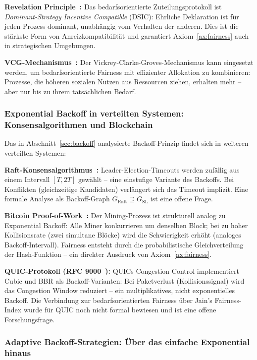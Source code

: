 ﻿\documentclass[a4paper,12pt]{article}
\theoremstyle{definition}
\begin{document}
\textbf{Revelation Principle~\cite{myerson1981optimal}:}
Das bedarfsorientierte Zuteilungsprotokoll ist
\emph{Dominant-Strategy Incentive Compatible} (DSIC):
Ehrliche Deklaration ist für jeden Prozess dominant,
unabhängig vom Verhalten der anderen. Dies ist die stärkste
Form von Anreizkompatibilität und garantiert Axiom~\ref{ax:fairness}
auch in strategischen Umgebungen.

\textbf{VCG-Mechanismus~\cite{vickrey1961counterspeculation}:}
Der Vickrey-Clarke-Groves-Mechanismus kann eingesetzt werden,
um bedarfsorientierte Fairness mit effizienter Allokation
zu kombinieren: Prozesse, die höheren sozialen Nutzen aus
Ressourcen ziehen, erhalten mehr -- aber nur bis zu ihrem
tatsächlichen Bedarf.

\subsubsection{Exponential Backoff in verteilten Systemen:
Konsensalgorithmen und Blockchain}

Das in Abschnitt~\ref{sec:backoff} analysierte Backoff-Prinzip
findet sich in weiteren verteilten Systemen:

\textbf{Raft-Konsensalgorithmus~\cite{ongaro2014raft}:}
Leader-Election-Timeouts werden zufällig aus einem Intervall
$[T, 2T]$ gewählt -- eine einstufige Variante des Backoffs.
Bei Konflikten (gleichzeitige Kandidaten) verlängert sich
das Timeout implizit. Eine formale Analyse als
Backoff-Graph $G_{\mathrm{Raft}} \supseteq G_{\mathrm{SL}}$
ist eine offene Frage.

\textbf{Bitcoin Proof-of-Work~\cite{nakamoto2008bitcoin}:}
Der Mining-Prozess ist strukturell analog zu Exponential
Backoff: Alle Miner konkurrieren um denselben Block; bei
zu hoher Kollisionsrate (zwei simultane Blöcke) wird die
Schwierigkeit erhöht (analoges Backoff-Intervall). Fairness
entsteht durch die probabilistische Gleichverteilung der
Hash-Funktion -- ein direkter Ausdruck von
Axiom~\ref{ax:fairness}.

\textbf{QUIC-Protokoll (RFC 9000~\cite{rfc9000}):} QUICs
Congestion Control implementiert Cubic und BBR als
Backoff-Varianten: Bei Paketverlust (Kollisionssignal)
wird das Congestion Window reduziert -- ein multiplikatives,
nicht exponentielles Backoff. Die Verbindung zur
bedarfsorientierten Fairness über Jain's Fairness-Index
wurde für QUIC noch nicht formal bewiesen und ist
eine offene Forschungsfrage.

\subsubsection{Adaptive Backoff-Strategien: Über das einfache
Exponential hinaus}
\end{document}
